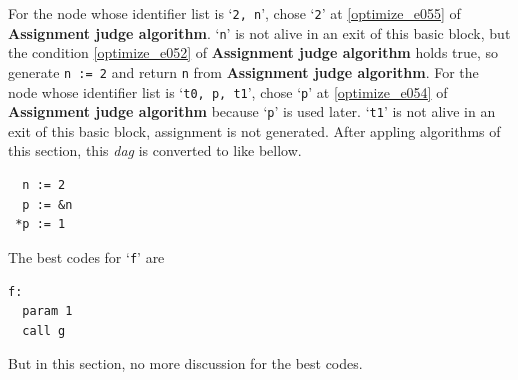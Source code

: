 \begin{Example}
For the node whose identifier list is `{\tt{2, n}}',
chose `{\tt{2}}' at \ref{optimize_e055} of {\bf Assignment judge algorithm}.
`{\tt{n}}' is not alive in an exit of this basic block, but
the condition \ref{optimize_e052} of {\bf Assignment judge algorithm}
holds true, so generate {\tt{n := 2}} and return {\tt{n}} from
{\bf Assignment judge algorithm}.
For the node whose identifier list is `{\tt{t0, p, t1}}',
chose `{\tt{p}}' at \ref{optimize_e054} of {\bf Assignment judge
 algorithm} because `{\tt{p}}' is used later.
 `{\tt{t1}}' is not alive in an exit of this basic block,
assignment is not generated.
After appling algorithms of this section,
this {\em dag} is converted to like bellow.
\begin{verbatim}
  n := 2
  p := &n
 *p := 1
\end{verbatim}
The best codes for `{\tt{f}}' are
\begin{verbatim}
f:
  param 1
  call g
\end{verbatim}
But in this section, no more discussion for the best codes.
\end{Example}


